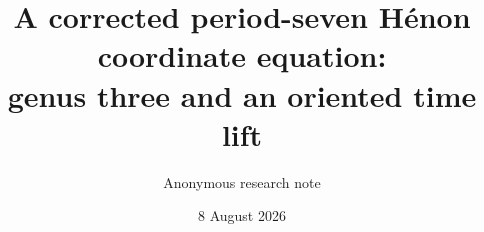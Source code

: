 \documentclass[11pt]{article}
\title{A corrected period-seven H\'enon coordinate equation:\\
genus three and an oriented time lift}
\author{Anonymous research note}
\date{8 August 2026}
\begin{document}
\maketitle
\begin{abstract}

\end{abstract}











\appendix

\end{document}
